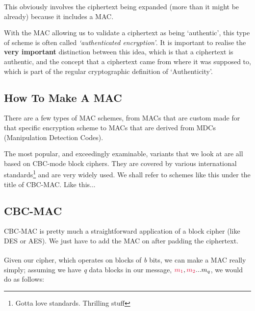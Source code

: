     This obviously involves the ciphertext being expanded (more than it might be already) because it includes a MAC. 

    With the MAC allowing us to validate a ciphertext as being `authentic', this type of scheme is often called \emph{`authenticated encryption'}.
    It is important to realise the \textbf{very important} distinction between this idea, which is that a ciphertext is authentic, and the concept that a ciphertext came from where it was supposed to, which is part of the regular cryptographic definition of `Authenticity'.

    \subsection{How To Make A MAC}
    There are a few types of MAC schemes, from MACs that are custom made for that specific encryption scheme to MACs that are derived from MDCs (Manipulation Detection Codes).

    The most popular, and exceedingly examinable, variants that we look at are all based on CBC-mode block ciphers. They are covered by various international standards\footnote{Gotta love standards. Thrilling stuff} and are very widely used. We shall refer to schemes like this under the title of CBC-MAC. Like this...

    \subsection{CBC-MAC}
    CBC-MAC is pretty much a straightforward application of a block cipher (like DES or AES). We just have to add the MAC on after padding the ciphertext.\\
    \\
    Given our cipher, which operates on blocks of \emph{b} bits, we can make a MAC really simply; assuming we have \emph{q} data blocks in our message, $\csubm{1}, \csubm{2}...m_{q}$, we would do as follows:

